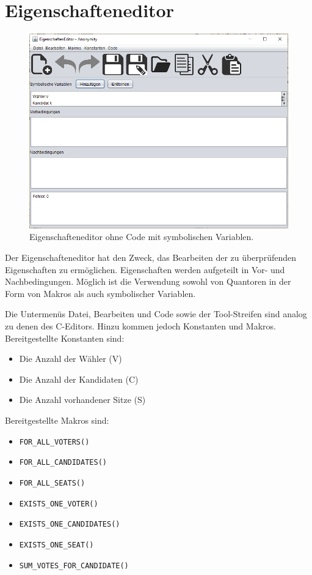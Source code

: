 \documentclass[a4paper]{scrreprt}
\begin{document}
\section{Eigenschafteneditor}

\begin{figure}[H]
\includegraphics[scale=0.5]{raw-ohne-code.png}
\caption{Eigenschafteneditor ohne Code mit symbolischen Variablen.}
\label{Eigenschaften-Editor-ohne-code}
\end{figure}

Der Eigenschafteneditor hat den Zweck, das Bearbeiten der zu überprüfenden Eigenschaften zu ermöglichen. Eigenschaften werden aufgeteilt in Vor- und Nachbedingungen. Möglich ist die Verwendung sowohl von Quantoren in der Form von Makros als auch symbolischer Variablen. 

Die Untermenüs Datei, Bearbeiten und Code sowie der Tool-Streifen sind analog zu denen des C-Editors. Hinzu kommen jedoch Konstanten und Makros. Bereitgestellte Konstanten sind: 

\begin{itemize}
\item Die Anzahl der Wähler (V)
\item Die Anzahl der Kandidaten (C)
\item Die Anzahl vorhandener Sitze (S)
\end{itemize}

Bereitgestellte Makros sind:

\begin{itemize}
\item \verb!FOR_ALL_VOTERS()!
\item \verb!FOR_ALL_CANDIDATES()!
\item \verb!FOR_ALL_SEATS()!
\item \verb!EXISTS_ONE_VOTER()!
\item \verb!EXISTS_ONE_CANDIDATES()!
\item \verb!EXISTS_ONE_SEAT()!
\item \verb!SUM_VOTES_FOR_CANDIDATE()!
\end{itemize}
\end{document}

